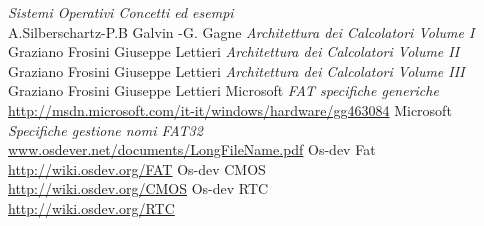 \begin{thebibliography}{100}
 \emph {Sistemi Operativi Concetti ed esempi} \\ A.Silberschartz-P.B Galvin -G. Gagne 
 \emph{Architettura dei Calcolatori Volume I} \\ Graziano Frosini Giuseppe Lettieri
 \emph{Architettura dei Calcolatori Volume II} \\ Graziano Frosini Giuseppe Lettieri
 \emph{Architettura dei Calcolatori Volume III} \\ Graziano Frosini Giuseppe Lettieri
 Microsoft \emph{FAT specifiche generiche} \\ \url {http://msdn.microsoft.com/it-it/windows/hardware/gg463084}
 Microsoft \emph{Specifiche gestione nomi FAT32} \\ \url {www.osdever.net/documents/LongFileName.pdf}
 Os-dev Fat \\ \url {http://wiki.osdev.org/FAT}
 Os-dev CMOS \\ \url {http://wiki.osdev.org/CMOS}
 Os-dev RTC \\ \url {http://wiki.osdev.org/RTC}
\end{thebibliography}
\clearpage{\pagestyle{empty}\cleardoublepage}
